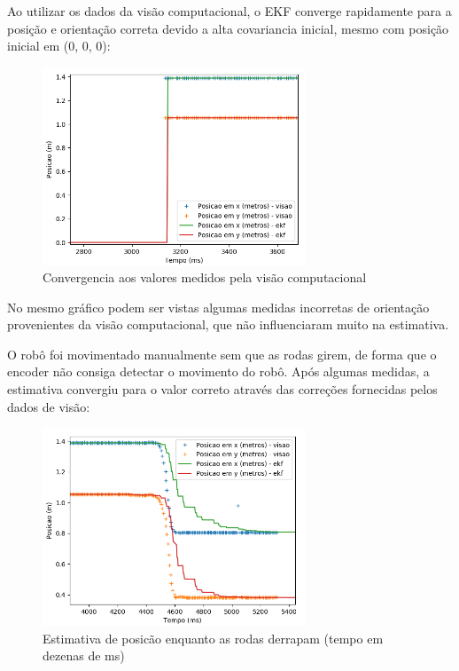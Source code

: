 \documentclass[
	12pt,				%
	openright,			%
	twoside,			%
	convert,
	a4paper,			%
	english,			%
	french,				%
	spanish,			%
	brazil				%
	]{abntex2}
\begin{document}
\par
Ao utilizar os dados da visão computacional, o EKF converge rapidamente para a posição e orientação correta devido a alta covariancia inicial, mesmo com posição inicial em (0, 0, 0):
\begin{figure}[H]
	\caption{Convergencia aos valores medidos pela visão computacional}
\begin{center}
   \includegraphics[width=0.7\textwidth]{ekf_vision_conv}
\end{center}
\end{figure}
No mesmo gráfico podem ser vistas algumas medidas incorretas de orientação provenientes da visão computacional, que não influenciaram muito na estimativa.
\par
O robô foi movimentado manualmente sem que as rodas girem, de forma que o encoder não consiga detectar o movimento do robô. Após algumas medidas, a estimativa convergiu para o valor correto através das correções fornecidas pelos dados de visão:
\begin{figure}[H]
	\caption{Estimativa de posicão enquanto as rodas derrapam (tempo em dezenas de ms)}
\begin{center}
   \includegraphics[width=0.7\textwidth]{ekf_pos_manual}
\end{center}
\end{figure}
\end{document}

